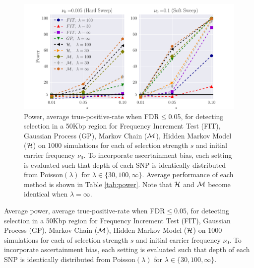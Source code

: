\documentclass[11pt]{article}
\begin{document}
\begin{figure}[H]
	\centering
	\includegraphics[trim=0.4in 0 .8in 0.02in , clip,width=\textwidth]{figures/power.pdf}
	\caption{Power, average true-positive-rate when FDR$\le$0.05, for detecting selection in a 50Kbp region for Frequency Increment Test (FIT), Gaussian Process (GP), Markov Chain (${\cal M}$), Hidden Markov Model (${\cal H}$) on 1000 
		simulations for each of selection strength $s$ and initial 
		carrier frequency $\nu_0$. To incorporate ascertainment bias, each setting is evaluated such that depth of each SNP is identically distributed from Poisson$(\lambda)$ for $\lambda \in \{30,100,\infty\}$. Average performance of each method is shown in Table \ref{tab:power}. Note that ${\cal H}$ and ${\cal M}$ become identical when $\lambda=\infty$.  } \label{fig:power}
\end{figure}
\begin{table}[h]
	
	\caption{Average power, average true-positive-rate when FDR$\le$0.05, for detecting selection in a 50Kbp region for Frequency Increment Test (FIT), Gaussian Process (GP), Markov Chain (${\cal M}$), Hidden Markov Model (${\cal H}$) on 1000 
		simulations for each of selection strength $s$ and initial 
		carrier frequency $\nu_0$. To incorporate ascertainment bias, each setting is evaluated such that depth of each SNP is identically distributed from Poisson$(\lambda)$ for $\lambda \in \{30,100,\infty\}$.}\label{tab:power}
\end{table}
\newpage
\end{document}
